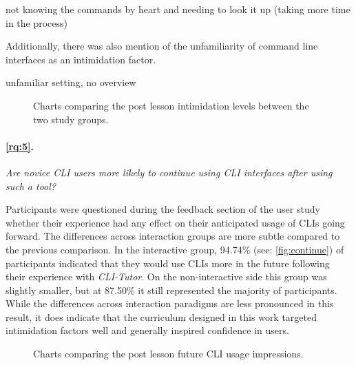 \begin{quotes}
	not knowing the commands by heart and needing to look it up (taking more time in the
	process)
\end{quotes}

Additionally, there was also mention of the unfamiliarity of command line
interfaces as an intimidation factor.

\begin{quotes}
	unfamiliar setting, no overview
\end{quotes}


\begin{figure}[htbp]
	\centering
	\scalebox{0.67}{}
	\caption{Charts comparing the post lesson intimidation levels between the two study groups.}
	\label{fig:confidence}
\end{figure}
\clearpage

\paragraph{\ref{rq:5}.} \textit{Are novice CLI users more likely to continue using CLI interfaces
	after using such a tool?}

Participants were questioned during the feedback section of the user study
whether their experience had any effect on their anticipated usage of CLIs
going forward. The differences across interaction groups are more subtle
compared to the previous comparison. In the interactive group, 94.74\% (see:
\autoref{fig:continue}) of participants indicated that they would use CLIs more
in the future following their experience with \textit{CLI-Tutor}. On the
non-interactive side this group was slightly smaller, but at 87.50\% it still
represented the majority of participants. While the differences across
interaction paradigms are less pronounced in this result, it does indicate that
the curriculum designed in this work targeted intimidation factors well and
generally inspired confidence in users.

\begin{figure}[htbp]
	\centering
	\scalebox{0.67}{}
	\caption{Charts comparing the post lesson future CLI usage impressions.}
	\label{fig:continue}
\end{figure}
